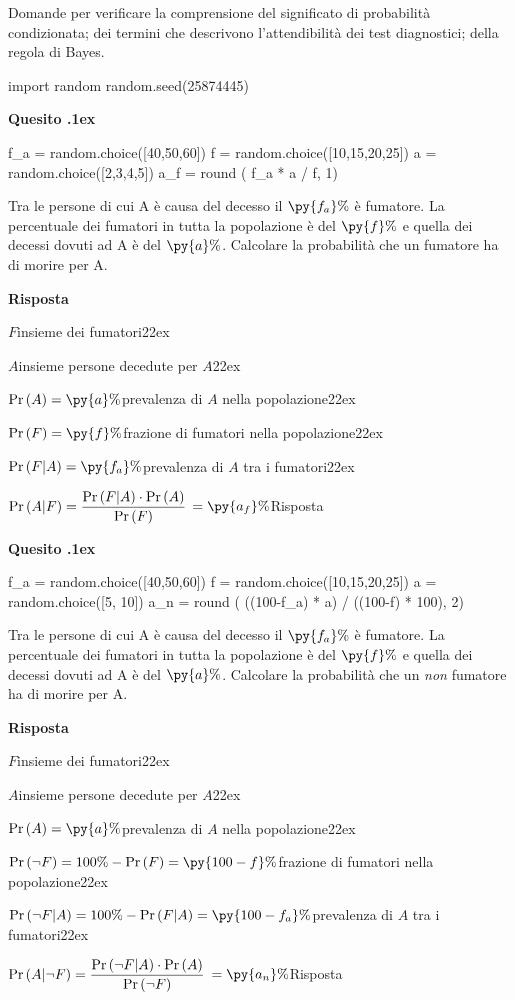 \documentclass[11pt,twoside,a4paper]{article}
\def\Pr{{\rm Pr\,}}
\newcounter{quesito}
\newenvironment{question}{\bigskip\addtocounter{quesito}{1}\par\textbf{Quesito \thequesito.\kern1ex}}{\vspace{\parskip}}
\newenvironment{answer}{\par\textbf{Risposta\quad}}{\vspace{\parskip}}
\begin{document}
Domande per verificare la comprensione del significato di probabilità condizionata; dei termini che descrivono l'attendibilità dei test diagnostici; della regola di Bayes.

\bigskip\bigskip

\begin{pycode}
import random
random.seed(25874445)
\end{pycode}


\begin{question}
\begin{pycode}
f_a = random.choice([40,50,60])
f = random.choice([10,15,20,25])
a = random.choice([2,3,4,5])
a_f = round ( f_a * a / f, 1)
\end{pycode}
Tra le persone di cui A è causa del decesso il $\py{f_a}\%$ è fumatore. La percentuale dei fumatori in tutta la popolazione è del $\py{f}\%$ e quella dei decessi dovuti ad A è del $\py{a}\%$. Calcolare la probabilità che un fumatore ha di morire per A.
\begin{answer}

$F$\hfill insieme dei fumatori\kern22ex

$A$\hfill insieme persone decedute per $A$\kern22ex

$\Pr(A)=\py{a}\%$\hfill prevalenza di $A$ nella popolazione\kern22ex

$\Pr(F)=\py{f}\%$\hfill frazione di fumatori nella popolazione\kern22ex

$\Pr(F|A)=\py{f_a}\%$\hfill prevalenza di $A$ tra i fumatori\kern22ex

$\Pr(A|F)=\dfrac{\Pr(F|A)\cdot \Pr(A)}{\Pr(F)}$ {\color{blue}$=\py{a_f}\%$\hfill Risposta}
\end{answer}
\end{question}


\begin{question}
\begin{pycode}
f_a = random.choice([40,50,60])
f = random.choice([10,15,20,25])
a = random.choice([5, 10])
a_n = round ( ((100-f_a) * a) / ((100-f) * 100), 2)
\end{pycode}
Tra le persone di cui A è causa del decesso il $\py{f_a}\%$ è fumatore.  La percentuale dei fumatori in tutta la popolazione è del $\py{f}\%$ e quella dei decessi dovuti ad A è del $\py{a}\%$. Calcolare la probabilità che un \textit{non\/} fumatore ha di morire per A.
\begin{answer}

$F$\hfill insieme dei fumatori\kern22ex

$A$\hfill insieme persone decedute per $A$\kern22ex

$\Pr(A)=\py{a}\%$\hfill prevalenza di $A$ nella popolazione\kern22ex

$\Pr(\neg F)=100\% - \Pr(F) =\py{100-f}\%$\hfill frazione di fumatori nella popolazione\kern22ex

$\Pr(\neg F|A)=100\%-\Pr(F|A)  =\py{100-f_a}\%$\hfill prevalenza di $A$ tra i fumatori\kern22ex

$\Pr(A|\neg F)=\dfrac{\Pr(\neg F|A)\cdot \Pr(A)}{\Pr(\neg F)}$  {\color{blue}$=\py{a_n}\%$\hfill Risposta}

\end{answer}
\end{question}
\end{document}
